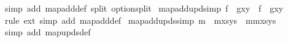 \begin{isabellebody}
%
\isadelimproof
%
\endisadelimproof
%
\isatagproof
{}\isamarkupfalse%
\ {\isacharparenleft}{\kern0pt}simp\ add{\isacharcolon}{\kern0pt}\ map{\isacharunderscore}{\kern0pt}add{\isacharunderscore}{\kern0pt}def\ split{\isacharcolon}{\kern0pt}\ option{\isachardot}{\kern0pt}split{\isacharparenright}{\kern0pt}%
\endisatagproof
{\isafoldproof}%
%
\isadelimproof
\isanewline
%
\endisadelimproof
\isanewline
{}\isamarkupfalse%
\ map{\isacharunderscore}{\kern0pt}add{\isacharunderscore}{\kern0pt}upd{\isacharbrackleft}{\kern0pt}simp{\isacharbrackright}{\kern0pt}{\isacharcolon}{\kern0pt}\ {\isachardoublequoteopen}f\ {\isacharplus}{\kern0pt}{\isacharplus}{\kern0pt}\ g{\isacharparenleft}{\kern0pt}x{\isasymmapsto}y{\isacharparenright}{\kern0pt}\ {\isacharequal}{\kern0pt}\ {\isacharparenleft}{\kern0pt}f\ {\isacharplus}{\kern0pt}{\isacharplus}{\kern0pt}\ g{\isacharparenright}{\kern0pt}{\isacharparenleft}{\kern0pt}x{\isasymmapsto}y{\isacharparenright}{\kern0pt}{\isachardoublequoteclose}\isanewline
%
\isadelimproof
%
\endisadelimproof
%
\isatagproof
{}\isamarkupfalse%
\ {\isacharparenleft}{\kern0pt}rule\ ext{\isacharparenright}{\kern0pt}\ {\isacharparenleft}{\kern0pt}simp\ add{\isacharcolon}{\kern0pt}\ map{\isacharunderscore}{\kern0pt}add{\isacharunderscore}{\kern0pt}def{\isacharparenright}{\kern0pt}%
\endisatagproof
{\isafoldproof}%
%
\isadelimproof
\isanewline
%
\endisadelimproof
\isanewline
{}\isamarkupfalse%
\ map{\isacharunderscore}{\kern0pt}add{\isacharunderscore}{\kern0pt}upds{\isacharbrackleft}{\kern0pt}simp{\isacharbrackright}{\kern0pt}{\isacharcolon}{\kern0pt}\ {\isachardoublequoteopen}m{}\ {\isacharplus}{\kern0pt}{\isacharplus}{\kern0pt}\ {\isacharparenleft}{\kern0pt}m{}{\isacharparenleft}{\kern0pt}xs{\isacharbrackleft}{\kern0pt}{\isasymmapsto}{\isacharbrackright}{\kern0pt}ys{\isacharparenright}{\kern0pt}{\isacharparenright}{\kern0pt}\ {\isacharequal}{\kern0pt}\ {\isacharparenleft}{\kern0pt}m{}{\isacharplus}{\kern0pt}{\isacharplus}{\kern0pt}m{}{\isacharparenright}{\kern0pt}{\isacharparenleft}{\kern0pt}xs{\isacharbrackleft}{\kern0pt}{\isasymmapsto}{\isacharbrackright}{\kern0pt}ys{\isacharparenright}{\kern0pt}{\isachardoublequoteclose}\isanewline
%
\isadelimproof
%
\endisadelimproof
%
\isatagproof
{}\isamarkupfalse%
\ {\isacharparenleft}{\kern0pt}simp\ add{\isacharcolon}{\kern0pt}\ map{\isacharunderscore}{\kern0pt}upds{\isacharunderscore}{\kern0pt}def{\isacharparenright}{\kern0pt}%
\endisatagproof
{\isafoldproof}%
%
\isadelimproof
\isanewline
%
\endisadelimproof

\end{isabellebody}
